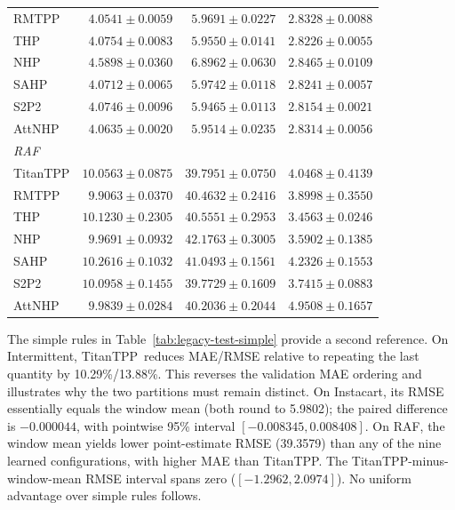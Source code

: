 \documentclass[runningheads]{llncs}
\newcommand{\method}{TitanTPP}
\begin{document}
\begin{table}[p]
\begin{tabular}{lrrr}
RMTPP & $4.0541 \pm 0.0059$ & $5.9691 \pm 0.0227$ & $2.8328 \pm 0.0088$ \\
THP & $4.0754 \pm 0.0083$ & $5.9550 \pm 0.0141$ & $2.8226 \pm 0.0055$ \\
NHP & $4.5898 \pm 0.0360$ & $6.8962 \pm 0.0630$ & $2.8465 \pm 0.0109$ \\
SAHP & $4.0712 \pm 0.0065$ & $5.9742 \pm 0.0118$ & $2.8241 \pm 0.0057$ \\
S2P2 & $4.0746 \pm 0.0096$ & $5.9465 \pm 0.0113$ & $2.8154 \pm 0.0021$ \\
AttNHP & $4.0635 \pm 0.0020$ & $5.9514 \pm 0.0235$ & $2.8314 \pm 0.0056$ \\
\midrule
\multicolumn{4}{l}{\textit{RAF}}\\
TitanTPP & $10.0563 \pm 0.0875$ & $39.7951 \pm 0.0750$ & $4.0468 \pm 0.4139$ \\
RMTPP & $9.9063 \pm 0.0370$ & $40.4632 \pm 0.2416$ & $3.8998 \pm 0.3550$ \\
THP & $10.1230 \pm 0.2305$ & $40.5551 \pm 0.2953$ & $3.4563 \pm 0.0246$ \\
NHP & $9.9691 \pm 0.0932$ & $42.1763 \pm 0.3005$ & $3.5902 \pm 0.1385$ \\
SAHP & $10.2616 \pm 0.1032$ & $41.0493 \pm 0.1561$ & $4.2326 \pm 0.1553$ \\
S2P2 & $10.0958 \pm 0.1455$ & $39.7729 \pm 0.1609$ & $3.7415 \pm 0.0883$ \\
AttNHP & $9.9839 \pm 0.0284$ & $40.2036 \pm 0.2044$ & $4.9508 \pm 0.1657$ \\
\bottomrule
\end{tabular}
\end{table}

The simple rules in Table~\ref{tab:legacy-test-simple} provide a second
reference. On Intermittent, \method\ reduces MAE/RMSE relative to repeating
the last quantity by 10.29\%/13.88\%. This reverses the validation MAE
ordering and illustrates why the two partitions must remain distinct.
On Instacart, its RMSE essentially equals the window mean (both round to
5.9802); the paired difference is $-0.000044$, with pointwise 95\% interval
$[-0.008345,0.008408]$. On RAF, the window mean yields lower point-estimate
RMSE (39.3579) than any of the nine learned configurations, with higher
MAE than \method. The TitanTPP-minus-window-mean RMSE interval spans zero
($[-1.2962,2.0974]$). No uniform advantage over simple rules follows.
\end{document}
